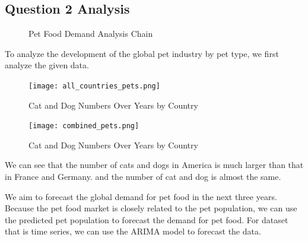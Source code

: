 \documentclass[withoutpreface,bwprint]{cumcmthesis} %
\begin{document}
\subsection{Question 2 Analysis}
\usetikzlibrary{positioning}
\begin{figure}[htbp]
    \centering
    \caption{Pet Food Demand Analysis Chain}
\end{figure}
To analyze the development of the global pet industry by pet type,
we first analyze the given data.
\clearpage
\begin{figure}[htbp]
	\centering
	\texttt{[image: all\_countries\_pets.png]}
	\caption{Cat and Dog Numbers Over Years by Country}
\end{figure}
\begin{figure}[htbp]
	\centering
	\texttt{[image: combined\_pets.png]}
	\caption{Cat and Dog Numbers Over Years by Country}
\end{figure}
\par We can see that the number of cats and dogs in America is much larger than that in France and Germany.
and the number of cat and dog is almost the same.
\par We aim to forecast the global demand for pet food in the next three years.
Because the pet food market is closely related to the pet population, we can use the predicted pet population to forecast the demand for pet food.
For dataset that is time series, we can use the ARIMA model to forecast the data.
\end{document}
